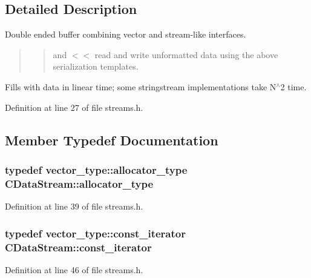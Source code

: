 \subsection{Detailed Description}
Double ended buffer combining vector and stream-\/like interfaces. \begin{quote}
\begin{quote}
and $<$$<$ read and write unformatted data using the above serialization templates. \end{quote}
\end{quote}
Fills with data in linear time; some stringstream implementations take N$^\wedge$2 time. 

Definition at line 27 of file streams.\+h.



\subsection{Member Typedef Documentation}
\hypertarget{class_c_data_stream_a297dff00e40bb161aab89fde868ee7b1}{}
\subsubsection[{allocator\+\_\+type}]{\setlength{\rightskip}{0pt plus 5cm}typedef vector\+\_\+type\+::allocator\+\_\+type {\bf C\+Data\+Stream\+::allocator\+\_\+type}}\label{class_c_data_stream_a297dff00e40bb161aab89fde868ee7b1}


Definition at line 39 of file streams.\+h.

\hypertarget{class_c_data_stream_abcfd79b72607505b22f18424e313b4c5}{}
\subsubsection[{const\+\_\+iterator}]{\setlength{\rightskip}{0pt plus 5cm}typedef vector\+\_\+type\+::const\+\_\+iterator {\bf C\+Data\+Stream\+::const\+\_\+iterator}}\label{class_c_data_stream_abcfd79b72607505b22f18424e313b4c5}


Definition at line 46 of file streams.\+h.

\hypertarget{class_c_data_stream_ada2ac4b4c962dd5a5dcccbc3f71e83ab}{}
